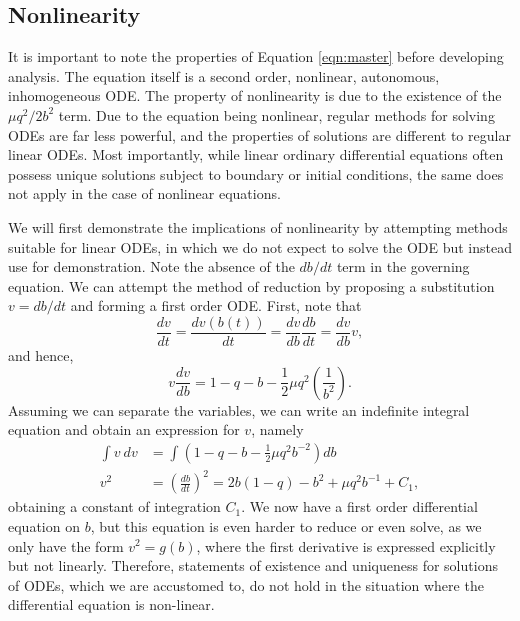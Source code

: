 
\subsection{Nonlinearity}

It is important to note the properties of Equation \ref{eqn:master} before developing analysis.
The equation itself is a second order, nonlinear, autonomous, inhomogeneous ODE.
The property of nonlinearity is due to the existence of the $\mu q^2/2b^2$ term.
Due to the equation being nonlinear, regular methods for solving ODEs are far less powerful,
and the properties of solutions are different to regular linear ODEs.
Most importantly, while linear ordinary differential equations often possess unique solutions subject to boundary or initial conditions,
the same does not apply in the case of nonlinear equations.

We will first demonstrate the implications of nonlinearity by attempting methods suitable for linear ODEs,
in which we do not expect to solve the ODE but instead use for demonstration.
Note the absence of the $db/dt$ term in the governing equation.
We can attempt the method of reduction by proposing a substitution $v=db/dt$ and forming a first order ODE.
First, note that
\begin{equation}
    \frac{dv}{dt} = \frac{dv(b(t))}{dt} = \frac{dv}{db}\frac{db}{dt} = \frac{dv}{db}v,
\end{equation}
and hence,
\begin{equation}
    v \frac{dv}{db} = 1 - q - b - \frac{1}{2}\mu q^2\left( \frac{1}{b^2} \right).
\end{equation}
Assuming we can separate the variables, we can write an indefinite integral equation and obtain an expression for $v$, namely
\begin{equation}
    \begin{aligned}
        \int v~dv &= \int \left(1 - q - b - \frac{1}{2}\mu q^2 b^{-2} \right) db \\  %
        v^2 &= \left(\frac{db}{dt}\right)^2 = 2b(1-q) - {b^2} + \mu q^2 b^{-1} + C_1, %
    \end{aligned}
    \label{eqn:first_order_reduction}
\end{equation}
obtaining a constant of integration $C_1$.
We now have a first order differential equation on $b$, %
but this equation is even harder to reduce or even solve, as we only have the form $v^2 = g(b)$,
where the first derivative is expressed explicitly but not linearly.
Therefore, statements of existence and uniqueness for solutions of ODEs,
which we are accustomed to,
do not hold in the situation where the differential equation is non-linear.

